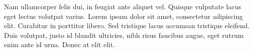 Nam ullamcorper felis dui, in feugiat ante aliquet vel. Quisque vulputate lacus eget lectus volutpat varius. Lorem ipsum dolor sit amet, consectetur adipiscing elit. Curabitur in porttitor libero. Sed tristique lacus accumsan tristique eleifend. Duis volutpat, justo id blandit ultricies, nibh risus faucibus augue, eget rutrum enim ante id urna. Donec at elit elit.\\

{\footnotesize
  

}